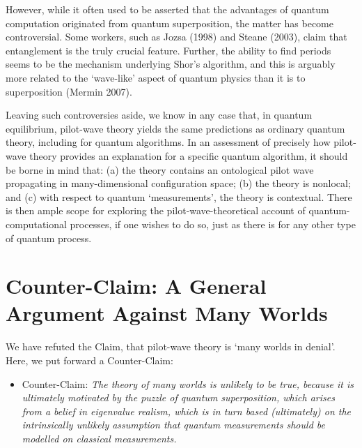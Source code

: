 \documentclass{article}%
\begin{document}
However, while it often used to be asserted that the advantages of quantum
computation originated from quantum superposition, the matter has become
controversial. Some workers, such as Jozsa (1998) and Steane (2003), claim
that entanglement is the truly crucial feature. Further, the ability to find
periods seems to be the mechanism underlying Shor's algorithm, and this is
arguably more related to the `wave-like' aspect of quantum physics than it is
to superposition (Mermin 2007).

Leaving such controversies aside, we know in any case that, in quantum
equilibrium, pilot-wave theory yields the same predictions as ordinary quantum
theory, including for quantum algorithms. In an assessment of precisely how
pilot-wave theory provides an explanation for a specific quantum algorithm, it
should be borne in mind that: (a) the theory contains an ontological pilot
wave propagating in many-dimensional configuration space; (b) the theory is
nonlocal; and (c) with respect to quantum `measurements', the theory is
contextual. There is then ample scope for exploring the pilot-wave-theoretical
account of quantum-computational processes, if one wishes to do so, just as
there is for any other type of quantum process.

\section{Counter-Claim: A General Argument Against Many Worlds}

We have refuted the Claim, that pilot-wave theory is `many worlds in denial'.
Here, we put forward a Counter-Claim:

\begin{itemize}
\item Counter-Claim: \textit{The theory of many worlds is unlikely to be true,
because it is ultimately motivated by the puzzle of quantum superposition,
which arises from a belief in eigenvalue realism, which is in turn based
(ultimately) on the intrinsically unlikely assumption that quantum
measurements should be modelled on classical measurements.}
\end{itemize}
\end{document}
